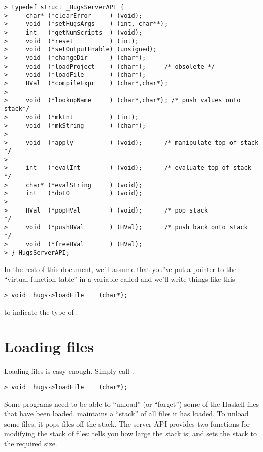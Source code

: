 \begin{verbatim}
> typedef struct _HugsServerAPI {
>     char* (*clearError     ) (void);
>     void  (*setHugsArgs    ) (int, char**);
>     int   (*getNumScripts  ) (void);
>     void  (*reset          ) (int);
>     void  (*setOutputEnable) (unsigned);
>     void  (*changeDir      ) (char*);
>     void  (*loadProject    ) (char*);     /* obsolete */
>     void  (*loadFile       ) (char*);
>     HVal  (*compileExpr    ) (char*,char*);
> 			       
>     void  (*lookupName     ) (char*,char*); /* push values onto stack*/
>     void  (*mkInt          ) (int);
>     void  (*mkString       ) (char*);
> 			       
>     void  (*apply          ) (void);      /* manipulate top of stack */
> 			       
>     int   (*evalInt        ) (void);      /* evaluate top of stack   */
>     char* (*evalString     ) (void);
>     int   (*doIO           ) (void);
> 			       
>     HVal  (*popHVal        ) (void);      /* pop stack               */
>     void  (*pushHVal       ) (HVal);      /* push back onto stack    */
>     void  (*freeHVal       ) (HVal); 
> } HugsServerAPI;
\end{verbatim}

In the rest of this document, we'll assume that you've put a pointer
to the ``virtual function table'' in a variable called  and
we'll write things like this

\begin{verbatim}
> void  hugs->loadFile    (char*);
\end{verbatim}

to indicate the type of .

\section{Loading files}\label{loading files}

Loading files is easy enough.  Simply call
.

\begin{verbatim}
> void  hugs->loadFile    (char*);
\end{verbatim}

Some programs need to be able to ``unload'' (or ``forget'') some of
the Haskell files that have been loaded.  \Hugs{} maintains a
``stack'' of all files it has loaded.  To unload some files, it pops
files off the stack.  The server API provides two functions for
modifying the stack of files:  tells you how large
the stack is; and  sets the stack to the required size.


